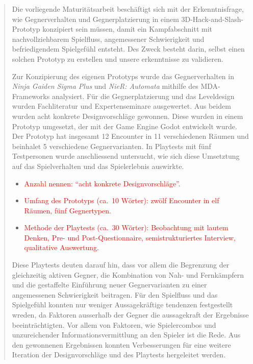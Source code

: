 \documentclass[10pt]{article}
\newcommand{\game}[1]{\textit{#1}}   %
\begin{document}
\begin{abstract}
    Die vorliegende Maturitätsarbeit beschäftigt sich mit der Erkenntnisfrage, wie Gegnerverhalten und Gegnerplatzierung in einem 3D-Hack-and-Slash-Prototyp konzipiert sein müssen, damit ein Kampfabschnitt mit nachvollziehbarem Spielfluss, angemessener Schwierigkeit und befriedigendem Spielgefühl entsteht. Des Zweck besteht darin, selbst einen solchen Prototyp zu erstellen und unsere erkenntnisse zu validieren.

    Zur Konzipierung des eigenen Prototyps wurde das Gegnerverhalten in \game{Ninja Gaiden Sigma Plus} und \game{NieR: Automata} mithilfe des MDA-Frameworks analysiert. Für die Gegnerplatzierung und das Leveldesign wurden Fachliteratur und Expertenseminare ausgewertet. Aus beidem wurden acht konkrete Designvorschläge gewonnen. Diese wurden in einem Prototyp umgesetzt, der mit der Game Engine Godot entwickelt wurde. Der Prototyp hat insgesamt 12 Encounter in 11 verschiedenen Räumen und beinhalet 5 verschiedene Gegnervarianten. In Playtests mit fünf Testpersonen wurde anschliessend untersucht, wie sich diese Umsetztung auf das Spielverhalten und das Spielerlebnis auswirkte.

    \begin{itemize}[nosep, leftmargin=*]
        \item \textcolor{red}{Anzahl nennen: \enquote{acht konkrete Designvorschläge}.}
        \item \textcolor{red}{Umfang des Prototyps (ca.\ 10 Wörter): zwölf Encounter in elf Räumen, fünf Gegnertypen.}
        \item \textcolor{red}{Methode der Playtests (ca.\ 30 Wörter): Beobachtung mit lautem Denken, Pre- und Post-Questionnaire, semistrukturiertes Interview, qualitative Auswertung.}
    \end{itemize}

    Diese Playtests deuten darauf hin, dass vor allem die Begrenzung der gleichzeitig aktiven Gegner, die Kombination von Nah- und Fernkämpfern und die gestaffelte Einführung neuer Gegnervarianten zu einer angemessenen Schwierigkeit beitragen. Für den Spielfluss und das Spielgefühl konnten nur weniger Aussagekräftige tendenzen festgestellt wreden, da Faktoren ausserhalb der Gegner die aussagekraft der Ergebnisse beeinträchtigten. Vor allem von Faktoren, wie Spielercombos und unzureichender Informationsvermittlung an den Spieler ist die Rede. Aus den gewonnenen Ergebnissen konnten Verbesserungen für eine weitere Iteration der Designvorschläge und des Playtests hergeleitet werden.


\end{abstract}
\end{document}
